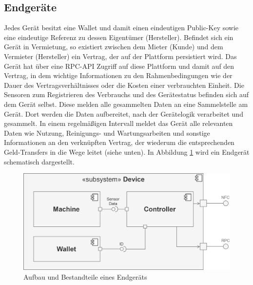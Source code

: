 \subsection{Endgeräte}
\label{subsec:iot_usecase:solution:device}
Jedes Gerät besitzt eine Wallet und damit einen eindeutigen Public-Key sowie eine eindeutige Referenz zu dessen Eigentümer (Hersteller). Befindet sich ein Gerät in Vermietung, so existiert zwischen dem Mieter (Kunde) und dem Vermieter (Hersteller) ein Vertrag, der auf der Plattform persistiert wird. Das Gerät hat über eine \ac{RPC}-\ac{API} Zugriff auf diese Plattform und damit auf den Vertrag, in dem wichtige Informationen zu den Rahmenbedingungen wie der Dauer des Vertragsverhältnisses oder die Kosten einer verbrauchten Einheit. Die Sensoren zum Registrieren des Verbrauchs und des Gerätestatus befinden sich auf dem Gerät selbst. Diese melden alle gesammelten Daten an eine Sammelstelle am Gerät. Dort werden die Daten aufbereitet, nach der Gerätelogik verarbeitet und gesammelt. In einem regelmäßigen Intervall meldet das Gerät alle relevanten Daten wie Nutzung, Reinigungs- und Wartungsarbeiten und sonstige Informationen an den verknüpften Vertrag, der wiederum die entsprechenden Geld-Transfers in die Wege leitet (siehe unten). In Abbildung \ref{fig:chapter04:usecase_device} wird ein Endgerät schematisch dargestellt.

\begin{figure}[htbp]
 \centering
 \includegraphics[width=1.0\textwidth]{gfx/Device_Component_UML.png}
 \caption{Aufbau und Bestandteile eines Endgeräts}
 \label{fig:chapter04:usecase_device}
\end{figure}

